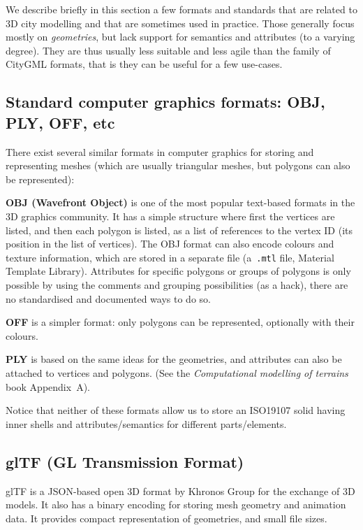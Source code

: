 We describe briefly in this section a few formats and standards that are related to 3D city modelling and that are sometimes used in practice.
Those generally focus mostly on \emph{geometries}, but lack support for semantics and attributes (to a varying degree).
They are thus usually less suitable and less agile than the family of CityGML formats, that is they can be useful for a few use-cases.



\subsection{Standard computer graphics formats: OBJ, PLY, OFF, etc}

There exist several similar formats in computer graphics for storing and representing meshes (which are usually triangular meshes, but polygons can also be represented):

\textbf{OBJ (Wavefront Object)} is one of the most popular text-based formats in the 3D graphics community.
It has a simple structure where first the vertices are listed, and then each polygon is listed, as a list of references to the vertex ID (its position in the list of vertices).
The OBJ format can also encode colours and texture information, which are stored in a separate file (a~\texttt{.mtl} file, Material Template Library).
Attributes for specific polygons or groups of polygons is only possible by using the comments and grouping possibilities (as a hack), there are no standardised and documented ways to do so.

\textbf{OFF} is a simpler format: only polygons can be represented, optionally with their colours.

\textbf{PLY} is based on the same ideas for the geometries, and attributes can also be attached to vertices and polygons. (See the \emph{Computational modelling of terrains} book Appendix~A).

Notice that neither of these formats allow us to store an ISO19107 solid having inner shells and attributes/semantics for different parts/elements.


\subsection{glTF (GL Transmission Format)}
glTF is a JSON-based open 3D format by Khronos Group for the exchange of 3D models.
It also has a binary encoding for storing mesh geometry and animation data.
It provides compact representation of geometries, and small file sizes.

